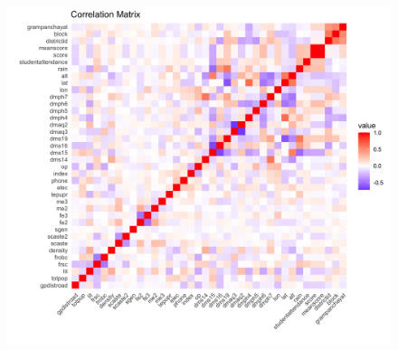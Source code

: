 \documentclass[12pt]{article}
\begin{document}

\begin{figure}[p]  %
  \centering
  \includegraphics[width=1\textwidth]{OUTPUT/MEDIA/correlation_matrix.png}  %
  \label{fig:corr}
\end{figure}
\end{document}
